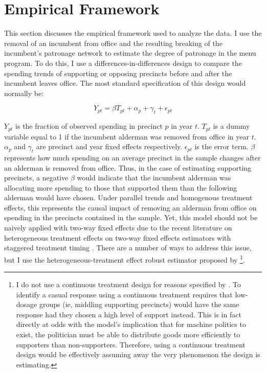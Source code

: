 \section{Empirical Framework}\label{sec:empframe}
This section discusses the empirical framework used to analyze the data.
I use the removal of an incumbent from office and the resulting breaking of the incumbent's patronage network to estimate the degree of patronage in the menu program.
To do this, I use a differences-in-differences design to compare the spending trends of supporting or opposing precincts before and after the incumbent leaves office. 
The most standard specification of this design would normally be:

\begin{equation}\label{eq:standard_did}
    Y_{pt} =  \beta T_{pt} + \alpha_{p} + \gamma_{t} + \epsilon_{pt}
\end{equation}

$Y_{pt}$ is the fraction of observed spending in precinct $p$ in year $t$. $T_{pt}$ is a dummy variable equal to 1 if the incumbent alderman was removed from office in year $t$. $\alpha_{p}$ and $\gamma_{t}$ are precinct and year fixed effects respectively. $\epsilon_{pt}$ is the error term.
$\beta$ represents how much spending on an average precinct in the sample changes after an alderman is removed from office.
Thus, in the case of estimating supporting precincts, a negative $\beta$ would indicate that the incumbent alderman was allocating more spending to those that supported them than the following alderman would have chosen.
Under parallel trends and homogenous treatment effects, this represents the causal impact of removing an alderman from office on spending in the precincts contained in the sample.
Yet, this model should not be naively applied with two-way fixed effects due to the recent literature on heterogeneous treatment effects on two-way fixed effects estimators with staggered treatment timing \citep{chaisetwfe} \citep{CALLAWAY2021200}. 
There are a number of ways to address this issue, but I use the heterogeneous-treatment effect robust estimator proposed by \citep{CALLAWAY2021200}\footnote[1]{I do not use a continuous treatment design for reasons specified by \cite{callaway2021_continuous}.
To identify a casual response using a continuous treatment requires that low-dosage groups (ie, middling supporting precincts) would have the same response had they chosen a high level of support instead.
This is in fact directly at odds with the \cite{dixit_londregan1996} model's implication that for machine politics to exist, the politician must be able to distribute goods more efficiently to supporters than non-supporters.
Therefore, using a continuous treatment design would be effectively assuming away the very phenomenon the design is estimating.}.



